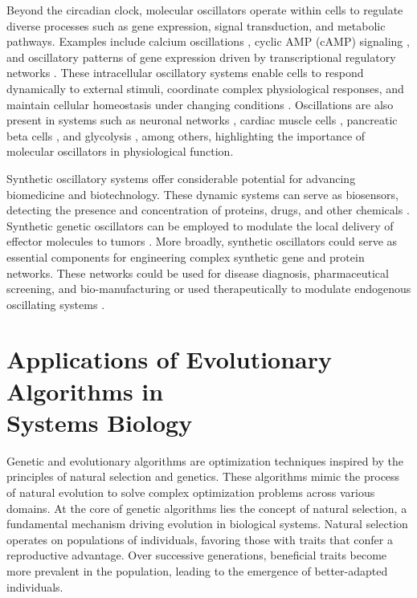 \documentclass[12pt]{report}
\begin{document}
Beyond the circadian clock, molecular oscillators operate within cells to regulate diverse processes such as gene expression, signal transduction, and metabolic pathways. Examples include calcium oscillations \cite{Smedler2014}, cyclic AMP (cAMP) signaling \cite{Dyachok2006}, and oscillatory patterns of gene expression driven by transcriptional regulatory networks \cite{Cerone2012}. These intracellular oscillatory systems enable cells to respond dynamically to external stimuli, coordinate complex physiological responses, and maintain cellular homeostasis under changing conditions \cite{Cheong2010, Jolma2010}. Oscillations are also present in systems such as neuronal networks \cite{Cebolla2019}, cardiac muscle cells \cite{Weiss2010, Montano2001}, pancreatic beta cells \cite{Watts2014}, and glycolysis \cite{Ghosh1964}, among others, highlighting the importance of molecular oscillators in physiological function.

Synthetic oscillatory systems offer considerable potential for advancing biomedicine and biotechnology. These dynamic systems can serve as biosensors, detecting the presence and concentration of proteins, drugs, and other chemicals \cite{Kis2015, CubillosRuiz2021}. Synthetic genetic oscillators can be employed to modulate the local delivery of effector molecules to tumors \cite{CubillosRuiz2021}. More broadly, synthetic oscillators could serve as essential components for engineering complex synthetic gene and protein networks. These networks could be used for disease diagnosis, pharmaceutical screening, and bio-manufacturing or used therapeutically to modulate endogenous oscillating systems \cite{Kis2015}.




\section[align=nothyphenated]{Applications of Evolutionary Algorithms in \\Systems Biology}
\label{section:intro_GA}
Genetic and evolutionary algorithms are optimization techniques inspired by the principles of natural selection and genetics. These algorithms mimic the process of natural evolution to solve complex optimization problems across various domains. At the core of genetic algorithms lies the concept of natural selection, a fundamental mechanism driving evolution in biological systems. Natural selection operates on populations of individuals, favoring those with traits that confer a reproductive advantage. Over successive generations, beneficial traits become more prevalent in the population, leading to the emergence of better-adapted individuals.
\end{document}
